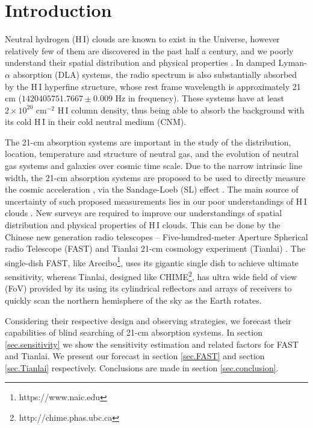 \documentclass[]{raa}
\newcommand{\HI}{{H{\small\,I}}}
\begin{document}
\section{Introduction}\label{sec.introduction}
Neutral hydrogen (\HI) clouds are known to exist in the Universe,
however relatively few of them are discovered in the past half a century,
and we poorly understand their spatial distribution and physical
properties \citep{2005ARA&A..43..861W}. 
In damped Lyman-$\alpha$ absorption (DLA)
systems, the radio spectrum is also substantially absorbed by the {\HI}
hyperfine structure, whose rest frame wavelength is approximately 21 cm
($1420405751.7667\pm 0.009$ Hz in frequency). These systems have
at least $2\times 10^{20}$ cm$^{-2}$ {\HI} column density, thus being
able to absorb the background with its cold {\HI} in their cold neutral medium (CNM).

The 21-cm absorption systems are important in the study of the 
distribution, location, temperature and structure of neutral gas,
and the evolution of neutral gas systems and galaxies over
cosmic time scale.
Due to the narrow intrinsic line width, the 21-cm absorption systems
are proposed to be used to directly measure the cosmic acceleration
\citep{2012ApJ...761L..26D,2014PhRvL.113d1303Y}, via the 
Sandage-Loeb (SL) effect \citep{1962ApJ...136..319S,1998ApJ...499L.111L}.
The main source of uncertainty of such proposed measurements lies in our
poor understandings of {\HI} clouds \citep{2014PhRvL.113d1303Y}.
New surveys are required
to improve our understandings of spatial distribution and physical
properties of {\HI} clouds.
This can be done by the Chinese new generation radio telescopes --
Five-hundred-meter Aperture Spherical radio Telescope (FAST)
\citep{2016RaSc...51.1060L} and Tianlai 21-cm cosmology experiment
(Tianlai) \citep{2012IJMPS..12..256C}.
The single-dish FAST, like Arecibo\footnote{https://www.naic.edu},
uses its gigantic single dish to achieve ultimate sensitivity, whereas
Tianlai, designed like CHIME\footnote{http://chime.phas.ubc.ca},
has ultra wide field of view (FoV) provided by its
using its cylindrical reflectors and arrays of receivers to
quickly scan the northern hemisphere of the sky as the Earth rotates.

Considering their respective design and observing strategies,
we forecast their capabilities of blind searching of 21-cm absorption
systems. In section \ref{sec.sensitivity} we show the sensitivity
estimation and related factors for FAST and Tianlai.
We present our forecast in section \ref{sec.FAST}
and section \ref{sec.Tianlai} respectively.
Conclusions are made in section \ref{sec.conclusion}.
\end{document}
